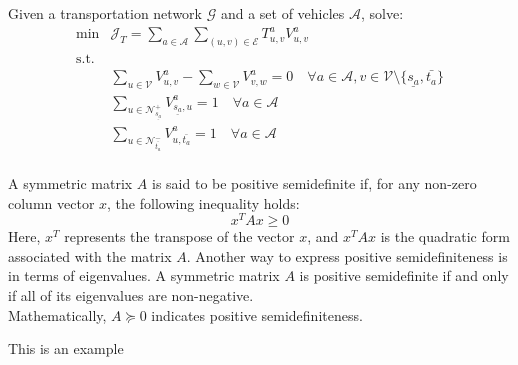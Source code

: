 \begin{problem}\label{prob:example} 
	Given a transportation network $\mathcal{G}$ and a set of vehicles $\mathcal{A}$, solve:
	\begin{align}
		\text{min}& 
		\mathcal{J}_T = \sum_{a \in \mathcal{A}} \sum_{(u, v) \in \mathcal{E}} T^a_{ u,v} V^a_{u,v}
		\nonumber\\
		\text{s.t.} &\nonumber\\
		&\sum_{u \in \mathcal{V}} V^a_{u, v} - \sum_{w \in \mathcal{V}} V^a_{v, w} = 0 \quad \forall a \in \mathcal{A}, v \in \mathcal{V} \setminus \{\underline{s_a}, \bar{t_a}\} \label{eq:flow_conservation_graph_u} \\
		&\sum_{ u \in \mathcal{N}^+_{\underline{s_a}} }V^a_{ \underline{s_a},u} = 1 \quad \forall a \in \mathcal{A} \label{eq:flow_cons_arrival_graph_u}\\
		&\sum_{u \in \mathcal{N}^-_{\bar{t_a}} } V^a_{u, \bar{t_a}} = 1 \quad \forall a \in \mathcal{A} \label{eq:flow_cons_departure_graph_u}\\
		\nonumber
	\end{align}
\end{problem}

\begin{definition}\label{def:positive_semidefinite}
	A symmetric matrix $A$ is said to be positive semidefinite if, for any non-zero column vector $x$, the following inequality holds:
	\begin{equation}
		x^T Ax \geq 0\label{eq:equation_test}
	\end{equation}
	Here, $x^T$ represents the transpose of the vector $x$, and $x^T Ax$ is the quadratic form associated with the matrix $A$. Another way to express positive semidefiniteness is in terms of eigenvalues. A symmetric matrix $A$ is positive semidefinite if and only if all of its eigenvalues are non-negative.\\
	Mathematically, $A \succeq 0 $ indicates positive semidefiniteness.
\end{definition}

\begin{example}\label{ex:example}
	This is an example
\end{example}


